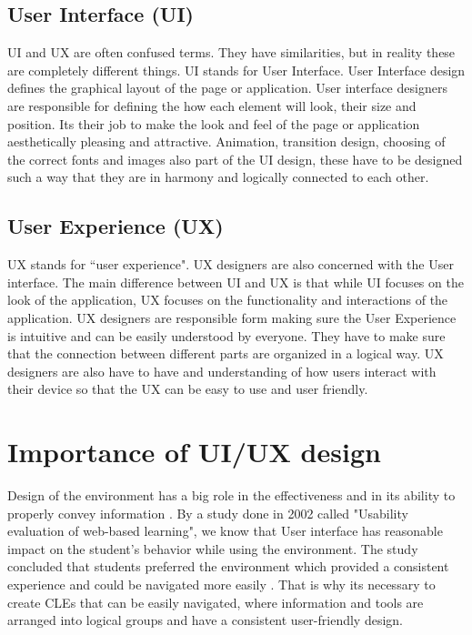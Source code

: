 \documentclass[10pt,english,a4paper]{article} %
\begin{document}
\subsection{User Interface (UI)}
UI and UX are often confused terms. \cite{theymakedesign_2019_what} They have similarities, but in reality
these are completely different things.
UI stands for User Interface. User Interface design defines the graphical layout of the page or application.
User interface designers are responsible for defining the how each element will look, their size and position.
Its their job to make the look and feel of the page or application aesthetically pleasing and 
attractive. Animation, transition design, choosing of the correct fonts and images also part of the UI design, 
these have to be designed such a way that they are in harmony and logically connected to each other.
\cite{theymakedesign_2019_what}

\subsection{User Experience (UX)}
UX stands for ``user experience". UX designers are also concerned with the User interface\cite{theymakedesign_2019_what}. 
The main difference between UI and UX is that while UI focuses on the look of the application,
UX focuses on the functionality and interactions of the application. UX designers are 
responsible form making sure the User Experience is intuitive and can be easily understood by everyone.
They have to make sure that the connection between different parts are organized in a logical way.
UX designers are also have to have and understanding of how users interact with their
device so that the UX can be easy to use and user friendly\cite{theymakedesign_2019_what}. 

\section{Importance of UI/UX design}\label{importance}
Design of the environment has a big role in the effectiveness and in 
its ability to properly convey information \cite{ui/ux}. 
By a study done in 2002 called "Usability evaluation of web-based learning", we know that User interface
has reasonable impact on the student's behavior while using the environment\cite{wesson_2002_usability}.
The study concluded that students preferred the environment which provided a consistent experience and could be navigated more easily
\cite{wesson_2002_usability}. That is why its necessary to create CLEs that can be easily navigated,
where information and tools are arranged into logical groups and have a consistent user-friendly design.
\end{document}
